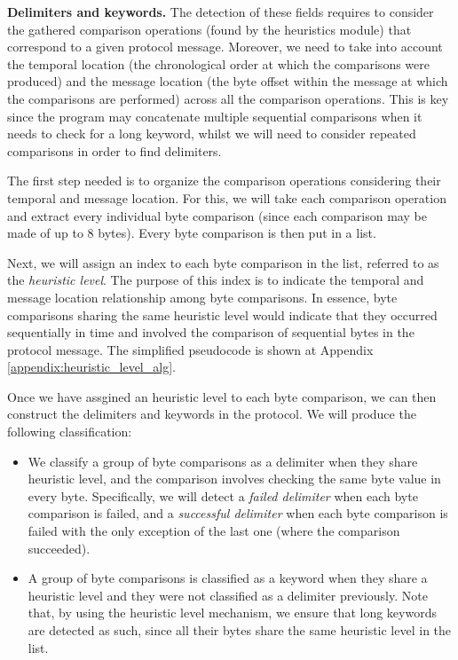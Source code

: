 \documentclass[conference]{IEEEtran}
\begin{document}
\textbf{Delimiters and keywords.}
The detection of these fields requires to consider the gathered comparison operations (found by the heuristics module)
that correspond to a given protocol message. Moreover, we need to take into account the temporal
location (the chronological order at which the comparisons were produced) and the message location (the byte
offset within the message at which the comparisons are performed) across all the comparison operations.
This is key since the program may concatenate multiple sequential comparisons when it needs to check for a long 
keyword, whilst we will need to consider repeated comparisons in order to find delimiters.

The first step needed is to organize the comparison operations considering their temporal and message location.
For this, we will take each comparison operation and extract every individual byte comparison (since each comparison may be
made of up to 8 bytes). Every byte comparison is then put in a list.

Next, we will assign an index to each byte comparison in the list, referred to as the \textit{heuristic level}.
The purpose of this index is to indicate the temporal and message location relationship among byte comparisons.
In essence, byte comparisons sharing the same heuristic level would indicate that they occurred sequentially in 
time and involved the comparison of sequential bytes in the protocol message. The simplified pseudocode is shown
at Appendix \ref{appendix:heuristic_level_alg}.

Once we have assgined an heuristic level to each byte comparison, we can then construct the delimiters and
keywords in the protocol. We will produce the following classification:
\begin{itemize}
    \item We classify a group of byte comparisons as a delimiter when they share heuristic level, and the
    comparison involves checking the same byte value in every byte. Specifically, we will detect a \textit{failed
    delimiter} when each byte comparison is failed, and a \textit{successful delimiter} when each byte comparison
    is failed with the only exception of the last one (where the comparison succeeded).
    \item A group of byte comparisons is classified as a keyword when they share a heuristic level and they were
    not classified as a delimiter previously. Note that, by using the heuristic level mechanism, we ensure that 
    long keywords are detected as such, since all their bytes share the same heuristic level in the list.
\end{itemize}
\end{document}
